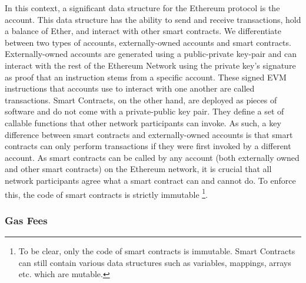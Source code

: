 \documentclass[letterpaper,twocolumn,10pt]{article}
\begin{document}
In this context, a significant data structure for the Ethereum protocol is the account. This data structure has the ability to send and receive transactions, hold a balance of Ether, and interact with other smart contracts. We differentiate between two types of accounts, externally-owned accounts and smart contracts. Externally-owned accounts are generated using a public-private key-pair and can interact with the rest of the Ethereum Network using the private key's signature as proof that an instruction stems from a specific account. These signed EVM instructions that accounts use to interact with one another are called transactions.  Smart Contracts, on the other hand, are deployed as pieces of software and do not come with a private-public key pair. They define a set of callable functions that other network participants can invoke. As such, a key difference between smart contracts and externally-owned accounts is that smart contracts can only perform transactions if they were first invoked by a different account. As smart contracts can be called by any account (both externally owned and other smart contracts) on the Ethereum network, it is crucial that all network participants agree what a smart contract can and cannot do. To enforce this, the code of smart contracts is strictly immutable \footnote{To be clear, only the code of smart contracts is immutable. Smart Contracts can still contain various data structures such as variables, mappings, arrays etc. which are mutable.}.

\subsubsection{Gas Fees}
\label{subsection:gas}
\end{document}
